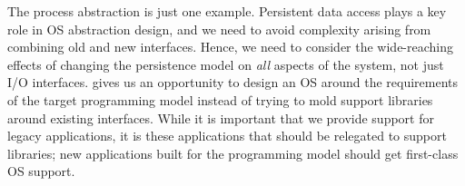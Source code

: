 {        %
        The process abstraction is just one example. Persistent data access plays a key role in OS
        abstraction design, and we need to avoid complexity arising from combining old and new interfaces.
        Hence, we need to consider the
        wide-reaching effects of changing the persistence model on \emph{all} aspects of the system, not
        just I/O interfaces. \NVM gives us an opportunity to design an OS around the requirements
        of the target programming model instead of trying to mold support libraries around existing
        interfaces. While it is important that we provide support for legacy applications,
        it is these applications that should be relegated to support libraries; new applications built for
        the programming model should get first-class OS support.
    }

